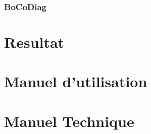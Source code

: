 \documentclass{article}
\begin{document}
	\paragraph{}

	\subsubsection{BoCoDiag}
	
	\section{Resultat}
	
	\section{Manuel d'utilisation}
	
	\section{Manuel Technique}
\end{document}
